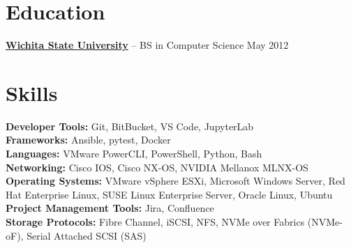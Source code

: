 \documentclass[11pt]{article}       %
\begin{document}
\vspace{-18.5pt}

\section*{Education}
\textbf{\href{https://www.southharmoninstituteoftechnology.org/}{Wichita State University}} -- BS in Computer Science \hfill May 2012




\section*{Skills}
\textbf{Developer Tools:} Git, BitBucket, VS Code, JupyterLab \\
\textbf{Frameworks:} Ansible, pytest, Docker \\
\textbf{Languages:} VMware PowerCLI, PowerShell, Python, Bash \\
\textbf{Networking:} Cisco IOS, Cisco NX-OS, NVIDIA Mellanox MLNX-OS \\
\textbf{Operating Systems:} VMware vSphere ESXi, Microsoft Windows Server, Red Hat Enterprise Linux, SUSE Linux Enterprise Server, Oracle Linux, Ubuntu \\
\textbf{Project Management Tools:} Jira, Confluence \\
\textbf{Storage Protocols:} Fibre Channel, iSCSI, NFS, NVMe over Fabrics (NVMe-oF), Serial Attached SCSI (SAS)

\vspace{-6.5pt}
\end{document}
